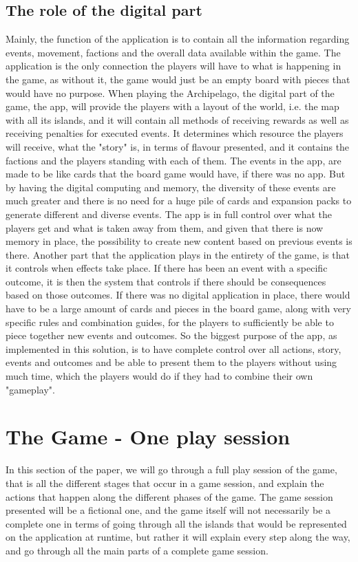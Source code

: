 \subsection{The role of the digital part}
Mainly, the function of the application is to contain all the information regarding events, movement, factions and the overall data available within the game. The application is the only connection the players will have to what is happening in the game, as without it, the game would just be an empty board with pieces that would have no purpose. 
When playing the Archipelago, the digital part of the game, the app, will provide the players with a layout of the world, i.e. the map with all its islands, and it will contain all methods of receiving rewards as well as receiving penalties for executed events. It determines which resource the players will receive, what the "story" is, in terms of flavour presented, and it contains the factions and the players standing with each of them.
The events in the app, are made to be like cards that the board game would have, if there was no app. But by having the digital computing and memory, the diversity of these events are much greater and there is no need for a huge pile of cards and expansion packs to generate different and diverse events. The app is in full control over what the players get and what is taken away from them, and given that there is now memory in place, the possibility to create new content based on previous events is there. Another part that the application plays in the entirety of the game, is that it controls when effects take place. If there has been an event with a specific outcome, it is then the system that controls if there should be consequences based on those outcomes. If there was no digital application in place, there would have to be a large amount of cards and pieces in the board game, along with very specific rules and combination guides, for the players to sufficiently be able to piece together new events and outcomes. So the biggest purpose of the app, as implemented in this solution, is to have complete control over all actions, story, events and outcomes and be able to present them to the players without using much time, which the players would do if they had to combine their own "gameplay".

\section{The Game - One play session}
In this section of the paper, we will go through a full play session of the game, that is all the different stages that occur in a game session, and explain the actions that happen along the different phases of the game.
The game session presented will be a fictional one, and the game itself will not necessarily be a complete one in terms of going through all the islands that would be represented on the application at runtime, but rather it will explain every step along the way, and go through all the main parts of a complete game session.

